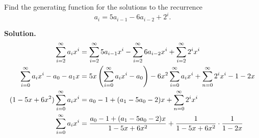 \documentclass{book}
\begin{document}
\setcounter{project}{262}
\addtocounter{project}{-1}
\begin{activity}[]\label{secondordernonhomo}
\hypertarget{p-1417}{}%
Find the generating function for the solutions to the recurrence%
\begin{equation*}
a_i=5a_{i-1}-6a_{i-2} + 2^i.
\end{equation*}
%
\par\smallskip%
\noindent\textbf{Solution.}\hypertarget{solution-199}{}\quad%
\hypertarget{p-1418}{}%
%
\begin{align*}
\sum_{i=2}^\infty a_ix^i  &=  \sum_{i=2}^\infty
5a_{i-1}x^i-\sum_{i=2}^\infty 6a_{i-2}x^i + \sum_{i=2}^\infty 2^ix^i\\
\sum_{i=0}^\infty a_ix^i -a_0-a_1x  &=
5x\left(\sum_{i=0}^\infty
a_{i}x^i-a_0\right)-6x^2\sum_{i=0}^\infty a_{i}x^i + \sum_{n=0}^\infty
2^ix^i-1-2x\\
(1-5x+6x^2)\sum_{i=0}^\infty a_ix^i &= a_0-1+(a_1-5a_0-2)x +
\sum_{n=0}^\infty 2^ix^i\\
\sum_{i=0}^\infty a_ix^i &=  \frac{a_0-1+(a_1-5a_0-2)x}{1-5x+6x^2}+ \frac{1}{1-5x+6x^2}\cdot\frac{1}{1-2x}
\end{align*}
%
\end{activity}
\end{document}
